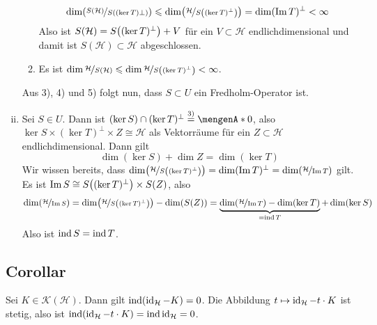 \begin{enumerate}[(i)]
\begin{enumerate}[1)]
		\[
			\dim \enbrace*{\nicefrac{S(\mathcal{H})}{S \enbrace*{(\ker T)\bot} }} \le \dim \enbrace*{\nicefrac{\mathcal{H}}{S \enbrace*{(\ker T)^\bot} }}  
			= \dim (\im T)^\bot < \infty
		\]
		Also ist $S(\mathcal{H})= S \enbrace*{(\ker T)^\bot} + V$ für ein $V \subset \mathcal{H}$ endlichdimensional und damit ist $S(\mathcal{H}) \subset \mathcal{H}$
		abgeschlossen.
		\item Es ist $\dim \nicefrac{\mathcal{H}}{S(\mathcal{H})} \le \dim  \nicefrac{\mathcal{H}}{S \enbrace*{(\ker T)^\bot}}<\infty$.
	\end{enumerate}
	Aus 3), 4) und 5) folgt nun, dass $S \subset U$ ein Fredholm-Operator ist.
	\item Sei $S \in U$. Dann ist $(\ker S) \cap (\ker T)^\bot \stackrel{\text{3)}}{=} \set{0}$, also $\ker S \times (\ker T)^\bot \times Z \cong \mathcal{H}$ als Vektorräume
	für ein $Z \subset \mathcal{H}$ endlichdimensional. Dann gilt
	\[
		\dim (\ker S) + \dim Z =\dim (\ker T)
	\]
	Wir wissen bereits, dass $\dim \enbrace*{\nicefrac{\mathcal{H}}{S \enbrace*{(\ker T)^\bot} }}=\dim (\im T)^\bot =\dim \enbrace*{\nicefrac{\mathcal{H}}{\im T}}$ gilt.
	Es ist $\im S \cong S \enbrace*{(\ker T)^\bot} \times S(Z)$, also
	\[
		\dim \enbrace*{\nicefrac{\mathcal{H}}{\im S}} = \dim \enbrace*{\nicefrac{\mathcal{H}}{S \enbrace*{(\ker T)^\bot}}} - \dim \enbrace*{S(Z)}
		= \underbrace{\dim \enbrace*{\nicefrac{\mathcal{H}}{\im T}} - \dim (\ker T)}_{=\idx T} + \dim (\ker S)
	\]
	Also ist $\idx S = \idx T$. \bewende
\end{enumerate}

\subsection{Corollar} %
\label{sub:94}
Sei $K \in \mathcal{K}(\mathcal{H})$. Dann gilt $\idx(\id_\mathcal{H}- K)=0$.
Die Abbildung $t \mapsto \id_\mathcal{H} - t \cdot K$ ist stetig, also ist $\idx \enbrace*{\id_\mathcal{H}- t \cdot K}=\idx \id_\mathcal{H}=0$. \bewende

